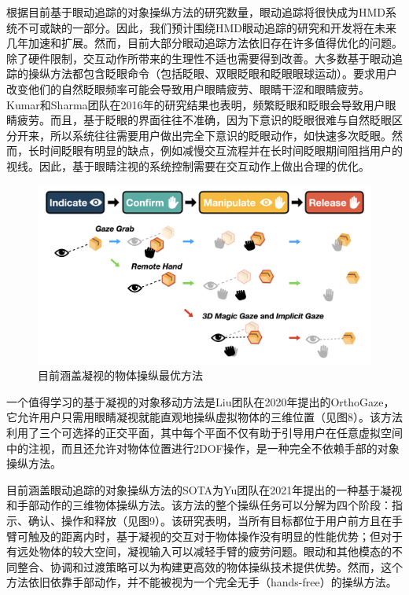 根据目前基于眼动追踪的对象操纵方法的研究数量，眼动追踪将很快成为HMD系统不可或缺的一部分。因此，我们预计围绕HMD眼动追踪的研究和开发将在未来几年加速和扩展。然而，目前大部分眼动追踪方法依旧存在许多值得优化的问题。除了硬件限制，交互动作所带来的生理性不适也需要得到改善。大多数基于眼动追踪的操纵方法都包含眨眼命令（包括眨眼、双眼眨眼和眨眼眼球运动）。要求用户改变他们的自然眨眼频率可能会导致用户眼睛疲劳、眼睛干涩和眼睛疲劳。Kumar和Sharma团队在2016年的研究结果也表明，频繁眨眼和眨眼会导致用户眼睛疲劳。而且，基于眨眼的界面往往不准确，因为下意识的眨眼很难与自然眨眼区分开来，所以系统往往需要用户做出完全下意识的眨眼动作，如快速多次眨眼。然而，长时间眨眼有明显的缺点，例如减慢交互流程并在长时间眨眼期间阻挡用户的视线。因此，基于眼睛注视的系统控制需要在交互动作上做出合理的优化。

\begin{figure}[b!]
    \centering
    \includegraphics[width=.7\textwidth]{figure/gaze_supported_sota.png}
    \caption{目前涵盖凝视的物体操纵最优方法}
    \label{fig-8}
\end{figure}

一个值得学习的基于凝视的对象移动方法是Liu团队在2020年提出的OrthoGaze，它允许用户只需用眼睛凝视就能直观地操纵虚拟物体的三维位置（见图8）。该方法利用了三个可选择的正交平面，其中每个平面不仅有助于引导用户在任意虚拟空间中的注视，而且还允许对物体位置进行2DOF操作，是一种完全不依赖手部的对象操纵方法。

目前涵盖眼动追踪的对象操纵方法的SOTA为Yu团队在2021年提出的一种基于凝视和手部动作的三维物体操纵方法。该方法的整个操纵任务可以分解为四个阶段：指示、确认、操作和释放（见图9）。该研究表明，当所有目标都位于用户前方且在手臂可触及的距离内时，基于凝视的交互对于物体操作没有明显的性能优势；但对于有远处物体的较大空间，凝视输入可以减轻手臂的疲劳问题。眼动和其他模态的不同整合、协调和过渡策略可以为构建更高效的物体操纵技术提供优势。然而，这个方法依旧依靠手部动作，并不能被视为一个完全无手（hands-free）的操纵方法。
